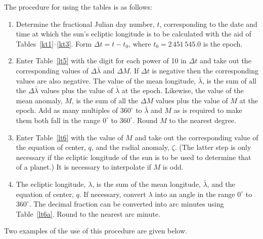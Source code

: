 The procedure for using the tables is as follows:
\begin{enumerate}
\item Determine the fractional Julian day number, $t$, corresponding to the date and time
at which the sun's ecliptic longitude is to be calculated with the aid of Tables~\ref{kt1}--\ref{kt3}. Form $\Delta t = t-t_0$, where $t_0=2\,451\,545.0$ is the epoch. 
\item Enter Table~\ref{lt5} with the digit for each power of 10
in ${\Delta} t$ and take out the corresponding values of $\Delta\bar{\lambda}$ and $\Delta M$. If $\Delta t$ is negative then the corresponding
values are also negative.
The value of the mean longitude, $\bar{\lambda}$, is the
sum of all the $\Delta\bar{\lambda}$ values plus the value of $\bar{\lambda}$ at the epoch. Likewise, the value of the mean anomaly, $M$, is
the sum of all the $\Delta M$ values plus the value of $M$ at the epoch. 
Add as many multiples of $360^\circ$ to $\bar{\lambda}$ and $M$
as is required to make them both fall in the range $0^\circ$ to $360^\circ$. Round $M$ to the nearest degree. 
\item Enter Table~\ref{lt6} with the value of $M$ and take out the
corresponding value of the equation of center, $q$, and the radial anomaly, $\zeta$. (The latter step is only necessary if the ecliptic longitude of the sun is
to be used to determine that of a planet.) It is necessary to interpolate if $M$ is odd.
\item The ecliptic longitude, $\lambda$, is the sum of the mean longitude, $\bar{\lambda}$, and the equation of center, $q$. If necessary, convert $\lambda$ into an angle in the range $0^\circ$ to $360^\circ$. 
The decimal fraction can be converted into arc minutes
using Table~\ref{lt6a}. Round to the nearest arc minute. 
\end{enumerate}
Two examples of the use of this procedure are given below.

